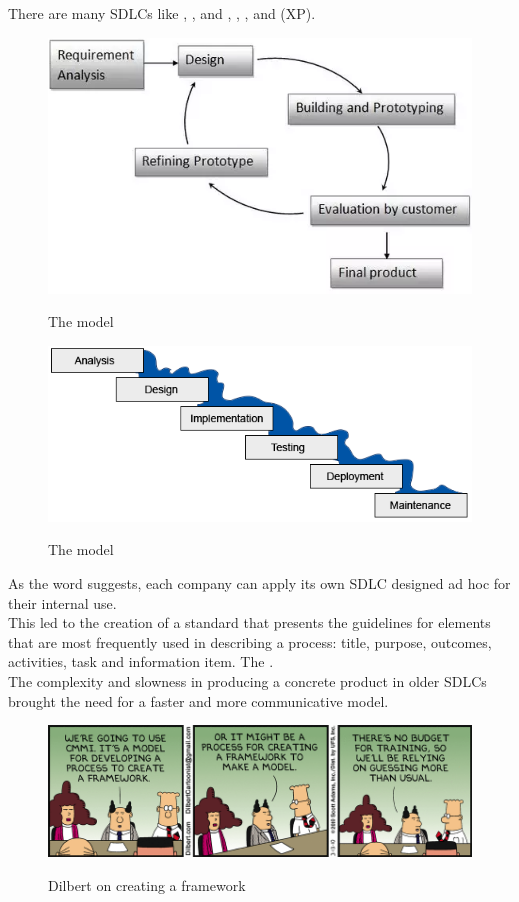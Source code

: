 There are many SDLCs like , ,  and , , , and  (XP). 
\begin{figure}[H]
	\centering
	\includegraphics[width=.7\textwidth]{resources/prototype}\\
	\caption{The  model}
\end{figure}
\begin{figure}[H]
	\centering
	\includegraphics[width=.8\textwidth]{resources/warterfall}\\
	\caption{The  model}
\end{figure}
As the word  suggests, each company can apply its own SDLC designed ad hoc for their internal use.\\
This led to the creation of a standard that presents the guidelines for elements that are most frequently used in describing a process: title, purpose, outcomes, activities, task and information item.
The \cite{iso_53815}.\\
The complexity and slowness in producing a concrete product in older SDLCs brought the need for a faster and more communicative model.
\begin{figure}[H]
	\centering
	\includegraphics[width=\textwidth]{resources/BffFTn_CAAAEvGn}\\
	\caption{Dilbert on creating a framework}
\end{figure}
